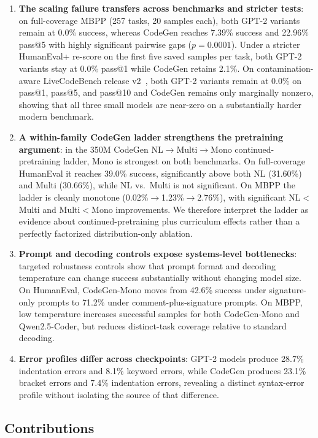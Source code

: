 \documentclass[preprint,12pt,authoryear]{elsarticle}
\begin{document}
\begin{enumerate}
\item \textbf{The scaling failure transfers across benchmarks and stricter tests}: on full-coverage MBPP (257 tasks, 20 samples each), both GPT-2 variants remain at 0.0\% success, whereas CodeGen reaches 7.39\% success and 22.96\% pass@5 with highly significant pairwise gaps ($p=0.0001$). Under a stricter HumanEval+ re-score on the first five saved samples per task, both GPT-2 variants stay at 0.0\% pass@1 while CodeGen retains 2.1\%. On contamination-aware LiveCodeBench release v2~\cite{jain2024livecodebench}, both GPT-2 variants remain at 0.0\% on pass@1, pass@5, and pass@10 and CodeGen remains only marginally nonzero, showing that all three small models are near-zero on a substantially harder modern benchmark.

\item \textbf{A within-family CodeGen ladder strengthens the pretraining argument}: in the 350M CodeGen NL$\rightarrow$Multi$\rightarrow$Mono continued-pretraining ladder, Mono is strongest on both benchmarks. On full-coverage HumanEval it reaches 39.0\% success, significantly above both NL (31.60\%) and Multi (30.66\%), while NL vs.\ Multi is not significant. On MBPP the ladder is cleanly monotone (0.02\%$\rightarrow$1.23\%$\rightarrow$2.76\%), with significant NL$<$Multi and Multi$<$Mono improvements. We therefore interpret the ladder as evidence about continued-pretraining plus curriculum effects rather than a perfectly factorized distribution-only ablation.

\item \textbf{Prompt and decoding controls expose systems-level bottlenecks}: targeted robustness controls show that prompt format and decoding temperature can change success substantially without changing model size. On HumanEval, CodeGen-Mono moves from 42.6\% success under signature-only prompts to 71.2\% under comment-plus-signature prompts. On MBPP, low temperature increases successful samples for both CodeGen-Mono and Qwen2.5-Coder, but reduces distinct-task coverage relative to standard decoding.

\item \textbf{Error profiles differ across checkpoints}: GPT-2 models produce 28.7\% indentation errors and 8.1\% keyword errors, while CodeGen produces 23.1\% bracket errors and 7.4\% indentation errors, revealing a distinct syntax-error profile without isolating the source of that difference.
\end{enumerate}

\subsection{Contributions}
\end{document}
